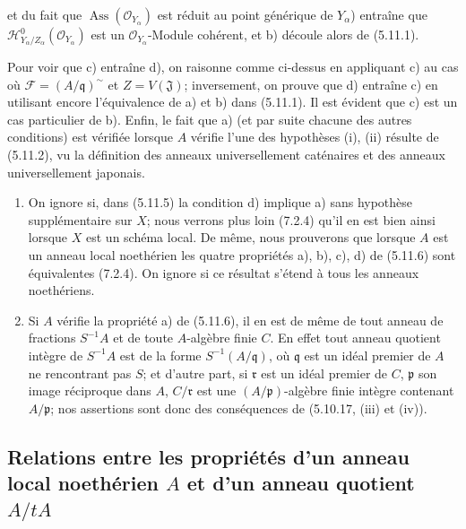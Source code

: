 
et du fait que $\operatorname{Ass}(\mathcal O_{Y_\alpha})$ est réduit au point
générique de $Y_\alpha$) entraîne que
$\mathcal H^0_{Y_\alpha/Z_\alpha}(\mathcal O_{Y_\alpha})$ est un
$\mathcal O_{Y_\alpha}$-Module cohérent, et b) découle alors de (5.11.1).

Pour voir que c) entraîne d), on raisonne comme ci-dessus en appliquant c) au
cas où $\mathcal F=(A/\mathfrak q)^\sim$ et $Z=V(\mathfrak J)$;
inversement, on prouve que d) entraîne c) en utilisant encore l'équivalence de
a) et b) dans (5.11.1). Il est évident que c) est un cas particulier de b).
Enfin, le fait que a) (et par suite chacune des autres conditions) est vérifiée
lorsque $A$ vérifie l'une des hypothèses (i), (ii) résulte de (5.11.2), vu la
définition des anneaux universellement caténaires et des anneaux
universellement japonais.

\begin{remarks}[5.11.7]
\label{IV.2.s5.11.7-fr}
\begin{enumerate}
\item[(i)] On ignore si, dans (5.11.5) la condition d) implique a) sans
hypothèse supplémentaire sur $X$; nous verrons plus loin (7.2.4) qu'il en est
bien ainsi lorsque $X$ est un schéma local. De même, nous prouverons que
lorsque $A$ est un anneau local noethérien les quatre propriétés a), b), c),
d) de (5.11.6) sont équivalentes (7.2.4). On ignore si ce résultat s'étend à
tous les anneaux noethériens.
\item[(ii)] Si $A$ vérifie la propriété a) de (5.11.6), il en est de même de
tout anneau de fractions $S^{-1}A$ et de toute $A$-algèbre finie $C$. En effet
tout anneau quotient intègre de $S^{-1}A$ est de la forme
$S^{-1}(A/\mathfrak q)$, où $\mathfrak q$ est un idéal premier de $A$ ne
rencontrant pas $S$; et d'autre part, si $\mathfrak r$ est un idéal premier de
$C$, $\mathfrak p$ son image réciproque dans $A$, $C/\mathfrak r$ est une
$(A/\mathfrak p)$-algèbre finie intègre contenant $A/\mathfrak p$; nos
assertions sont donc des conséquences de (5.10.17, (iii) et (iv)).
\end{enumerate}
\end{remarks}

\subsection{Relations entre les propriétés d'un anneau local noethérien $A$ et
d'un anneau quotient $A/tA$}

